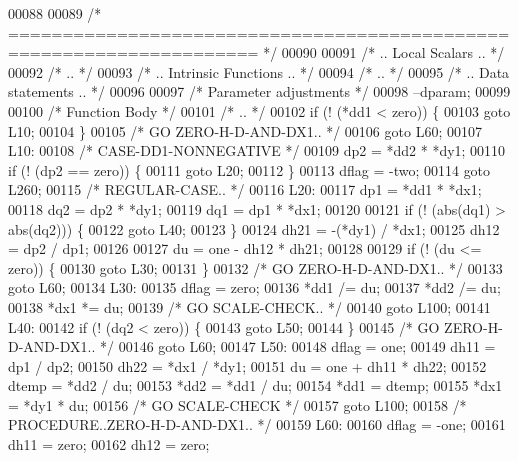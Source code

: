 \begin{DoxyCode}
00088 
00089 \textcolor{comment}{/*  ===================================================================== */}
00090 
00091 \textcolor{comment}{/*     .. Local Scalars .. */}
00092 \textcolor{comment}{/*     .. */}
00093 \textcolor{comment}{/*     .. Intrinsic Functions .. */}
00094 \textcolor{comment}{/*     .. */}
00095 \textcolor{comment}{/*     .. Data statements .. */}
00096 
00097     \textcolor{comment}{/* Parameter adjustments */}
00098     --dparam;
00099 
00100     \textcolor{comment}{/* Function Body */}
00101 \textcolor{comment}{/*     .. */}
00102     \textcolor{keywordflow}{if} (! (*dd1 < zero)) \{
00103     \textcolor{keywordflow}{goto} L10;
00104     \}
00105 \textcolor{comment}{/*       GO ZERO-H-D-AND-DX1.. */}
00106     \textcolor{keywordflow}{goto} L60;
00107 L10:
00108 \textcolor{comment}{/*     CASE-DD1-NONNEGATIVE */}
00109     dp2 = *dd2 * *dy1;
00110     \textcolor{keywordflow}{if} (! (dp2 == zero)) \{
00111     \textcolor{keywordflow}{goto} L20;
00112     \}
00113     dflag = -two;
00114     \textcolor{keywordflow}{goto} L260;
00115 \textcolor{comment}{/*     REGULAR-CASE.. */}
00116 L20:
00117     dp1 = *dd1 * *dx1;
00118     dq2 = dp2 * *dy1;
00119     dq1 = dp1 * *dx1;
00120 
00121     \textcolor{keywordflow}{if} (! (abs(dq1) > abs(dq2))) \{
00122     \textcolor{keywordflow}{goto} L40;
00123     \}
00124     dh21 = -(*dy1) / *dx1;
00125     dh12 = dp2 / dp1;
00126 
00127     du = one - dh12 * dh21;
00128 
00129     \textcolor{keywordflow}{if} (! (du <= zero)) \{
00130     \textcolor{keywordflow}{goto} L30;
00131     \}
00132 \textcolor{comment}{/*         GO ZERO-H-D-AND-DX1.. */}
00133     \textcolor{keywordflow}{goto} L60;
00134 L30:
00135     dflag = zero;
00136     *dd1 /= du;
00137     *dd2 /= du;
00138     *dx1 *= du;
00139 \textcolor{comment}{/*         GO SCALE-CHECK.. */}
00140     \textcolor{keywordflow}{goto} L100;
00141 L40:
00142     \textcolor{keywordflow}{if} (! (dq2 < zero)) \{
00143     \textcolor{keywordflow}{goto} L50;
00144     \}
00145 \textcolor{comment}{/*         GO ZERO-H-D-AND-DX1.. */}
00146     \textcolor{keywordflow}{goto} L60;
00147 L50:
00148     dflag = one;
00149     dh11 = dp1 / dp2;
00150     dh22 = *dx1 / *dy1;
00151     du = one + dh11 * dh22;
00152     dtemp = *dd2 / du;
00153     *dd2 = *dd1 / du;
00154     *dd1 = dtemp;
00155     *dx1 = *dy1 * du;
00156 \textcolor{comment}{/*         GO SCALE-CHECK */}
00157     \textcolor{keywordflow}{goto} L100;
00158 \textcolor{comment}{/*     PROCEDURE..ZERO-H-D-AND-DX1.. */}
00159 L60:
00160     dflag = -one;
00161     dh11 = zero;
00162     dh12 = zero;

\end{DoxyCode}
